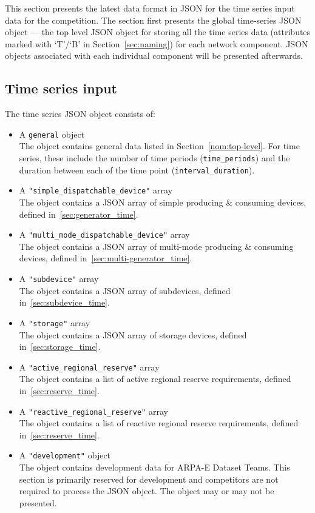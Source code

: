 \label{sec:time_series}
This section presents the latest data format in JSON for the 
time series input data for the competition.
The section first presents the global time-series JSON object --- the
top level JSON object for storing all the time series data 
(attributes marked with `T'/`B' in Section~\ref{sec:naming})
for each network component.
JSON objects associated with each individual component will be presented afterwards.


\subsection{Time series input}
\label{sec:input_data}
The time series JSON object consists of:
\begin{itemize}
    \item A \texttt{general} object\\
    The object contains general data listed
    in Section~\ref{nom:top-level}.
    For time series, these include the number of time periods (\texttt{time\_periods}) and the duration
    between each of the time point (\texttt{interval\_duration}).
    \item A \texttt{"simple\_dispatchable\_device"} array\\
    The object contains a JSON array of simple producing \& consuming devices, defined in~\ref{sec:generator_time}.
    \item A \texttt{"multi\_mode\_dispatchable\_device"} array \\
    The object contains a JSON array of multi-mode producing \& consuming devices, defined in~\ref{sec:multi-generator_time}.
    \item A \texttt{"subdevice"} array\\
    The object contains a JSON array of subdevices, defined in~\ref{sec:subdevice_time}.
    \item A \texttt{"storage"} array\\
    The object contains a JSON array of storage devices, defined in~\ref{sec:storage_time}.
    \item A \texttt{"active\_regional\_reserve"} array\\
    The object contains a list of active regional reserve requirements, defined in~\ref{sec:reserve_time}.
    \item A \texttt{"reactive\_regional\_reserve"} array\\
    The object contains a list of reactive regional reserve requirements, defined in~\ref{sec:reserve_time}.    
    \item A \texttt{"development"} object\\
    The object contains development data for ARPA-E Dataset Teams. This section is primarily reserved for development and competitors are not required to process the JSON object. The object may or may not be presented. 
\end{itemize}

